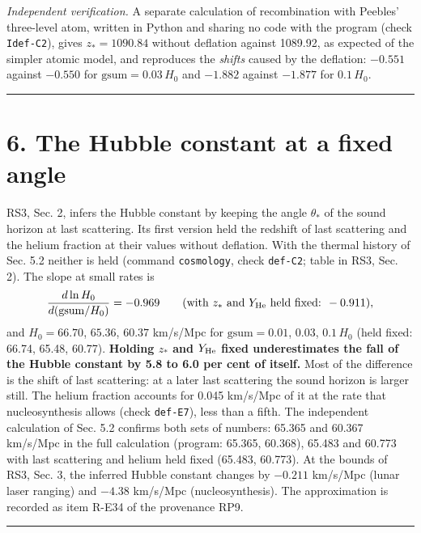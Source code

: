 \documentclass[
  10pt,
]{article}
\begin{document}
\emph{Independent verification.} A separate calculation of recombination
with Peebles' three-level atom, written in Python and sharing no code
with the program (check \texttt{Idef-C2}), gives \(z_*=1090.84\) without
deflation against 1089.92, as expected of the simpler atomic model, and
reproduces the \emph{shifts} caused by the deflation: \(-0.551\) against
\(-0.550\) for \(\mathrm{gsum}=0.03\,H_0\) and \(-1.882\) against
\(-1.877\) for \(0.1\,H_0\).

\begin{center}\rule{0.5\linewidth}{0.5pt}\end{center}

\hypertarget{the-hubble-constant-at-a-fixed-angle}{%
\section{6. The Hubble constant at a fixed
angle}\label{the-hubble-constant-at-a-fixed-angle}}

RS3, Sec. 2, infers the Hubble constant by keeping the angle
\(\theta_*\) of the sound horizon at last scattering. Its first version
held the redshift of last scattering and the helium fraction at their
values without deflation. With the thermal history of Sec. 5.2 neither
is held (command \texttt{cosmology}, check \texttt{def-C2}; table in
RS3, Sec. 2). The slope at small rates is
\[\frac{d\ln H_0}{d(\mathrm{gsum}/H_0)}=-0.969\qquad(\text{with } z_* \text{ and } Y_{\rm He}\text{ held fixed: }-0.911),\]
and \(H_0=66.70\), \(65.36\), \(60.37\) km/s/Mpc for
\(\mathrm{gsum}=0.01\), \(0.03\), \(0.1\,H_0\) (held fixed: 66.74,
65.48, 60.77). \textbf{Holding \(z_*\) and \(Y_{\rm He}\) fixed
underestimates the fall of the Hubble constant by 5.8 to 6.0 per cent of
itself.} Most of the difference is the shift of last scattering: at a
later last scattering the sound horizon is larger still. The helium
fraction accounts for 0.045 km/s/Mpc of it at the rate that
nucleosynthesis allows (check \texttt{def-E7}), less than a fifth. The
independent calculation of Sec. 5.2 confirms both sets of numbers:
65.365 and 60.367 km/s/Mpc in the full calculation (program: 65.365,
60.368), 65.483 and 60.773 with last scattering and helium held fixed
(65.483, 60.773). At the bounds of RS3, Sec. 3, the inferred Hubble
constant changes by \(-0.211\) km/s/Mpc (lunar laser ranging) and
\(-4.38\) km/s/Mpc (nucleosynthesis). The approximation is recorded as
item R-E34 of the provenance RP9.

\begin{center}\rule{0.5\linewidth}{0.5pt}\end{center}
\end{document}
